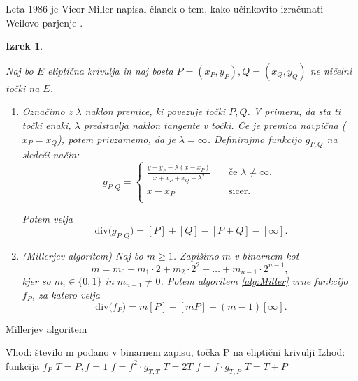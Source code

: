 \documentclass[12pt,a4paper,twoside]{article}
\theoremstyle{definition} %
\theoremstyle{plain} %
\newtheorem{izrek}[definicija]{Izrek}
\numberwithin{equation}{section}  %
\newcommand{\Div}[1]{\ \text{div(}{#1}\text{)}}
\begin{document}
Leta $1986$ je Vicor Miller napisal članek o tem, kako učinkovito izračunati Weilovo parjenje \cite{Miller} .

\begin{izrek}~

\label{izrek:Miller}

Naj bo $E$ eliptična krivulja in naj bosta $P=(x_P,y_P), Q = (x_Q,y_Q)$ ne ničelni točki na $E$.
\begin{enumerate}
\item Označimo z $\lambda$ naklon premice, ki povezuje točki $P,Q$. V primeru, da sta ti točki enaki, $\lambda$ predstavlja naklon tangente v točki. Če je premica navpična ($x_P = x_Q$), potem privzamemo, da je $\lambda = \infty$. Definirajmo funkcijo $g_{P,Q}$ na sledeči način:
\[ g_{P,Q} =
\begin{cases}
\frac{y-y_P-\lambda(x-x_P)}{x+x_P+x_Q-\lambda^2} & \quad \text{če } \lambda \neq \infty ,\\
x-x_P & \quad \text{sicer} .\\
\end{cases}
\]

Potem velja 
$$\Div{g_{P,Q}} = [P] + [Q] - [P+Q] - [\infty].$$


\item (Millerjev algoritem) Naj bo $m \geq 1$. Zapišimo $m$ v binarnem kot
$$m = m_0+m_1\cdot 2 + m_2\cdot 2^2 + \ldots + m_{n-1}\cdot 2^{n-1},$$
kjer so $m_i \in \{ 0,1 \}$ in $m_{n-1} \neq 0$. Potem algoritem \ref{alg:Miller} vrne
funkcijo $f_P$, za katero velja
$$\Div{f_P} = m[P]-[mP]-(m-1)[\infty].$$ 


\end{enumerate}


\end{izrek}

\begin{algorithm}[H]
\caption[Miller]{Millerjev algoritem}
\label{alg:Miller}

\begin{algorithmic}
\State Vhod: število m podano v binarnem zapisu, točka P na eliptični krivulji
\State Izhod: funkcija $f_P$
\State $T = P,f = 1$
	\State $f = f^2 \cdot g_{T,T}$
	\State $T = 2T$
		\State $f = f \cdot g_{T,P}$
		\State $T=T+P$
	\EndIf
	
\EndFor

\end{algorithmic}
\end{algorithm}
\end{document}
